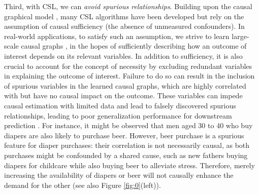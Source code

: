  
 
Third, with \acrshort{CSL}, we can \textit{avoid spurious relationships}. %
Building upon the causal graphical model \citep[see e.g., ]%
[]{pearl2009causal}, many \acrshort{CSL} algorithms have been developed \citep[see e.g.,][]{spirtes2000constructing,chickering2002optimal,shimizu2006linear,kalisch2007estimating,buhlmann2014cam,ramsey2017million,zheng2018dags,yu2019dag,zhu2019causal,cai2020anoce} but rely on the assumption of causal sufficiency (the absence of unmeasured confounders). In real-world applications, to satisfy such an assumption, we strive to learn large-scale causal graphs \citep[see e.g.,][]{nandy2017estimating,chakrabortty2018inference,tang2020long,niu2021counterfactual}, in the hopes of {sufficiently} describing how an outcome of interest depends on its relevant variables.  
In addition to sufficiency, it is also crucial to account for the concept of {necessity} by excluding redundant variables in explaining the outcome of interest. Failure to do so can result in the inclusion of spurious variables in the learned causal graphs, which are highly correlated with but have no causal impact on the outcome. These variables can impede causal estimation with limited data and lead to falsely discovered spurious relationships, leading to poor generalization performance for downstream prediction \citep{scholkopf2021toward}. For instance, it might be observed that men aged 30 to 40 who buy diapers are also likely to purchase beer. However, beer purchase is a spurious feature for diaper purchases: their correlation is not necessarily causal, as both purchases might be confounded by a shared cause, such as new fathers buying diapers for childcare while also buying beer to alleviate stress. Therefore, merely increasing the availability of diapers or beer will not causally enhance the demand for the other (see also Figure \ref{fig:0}(left)).

